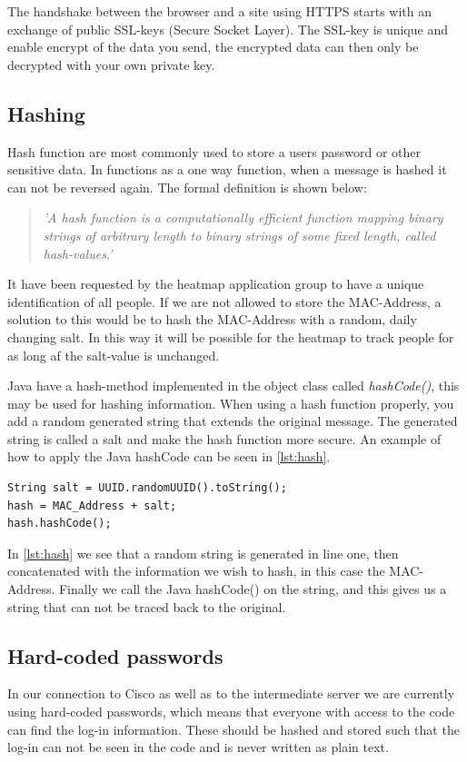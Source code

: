 The handshake between the browser and a site using HTTPS starts with an exchange of public SSL-keys (Secure Socket Layer). The SSL-key is unique and enable encrypt of the data you send, the encrypted data can then only be decrypted with your own private key\cite{HTTPS}. 

\subsection*{Hashing}
Hash function are most commonly used to store a users password or other sensitive data. In functions as a one way function, when a message is hashed it can not be reversed again. The formal definition is shown below:
\begin{quote}
\textit{'A hash function is a computationally efficient function mapping binary strings of arbitrary length to binary strings of some fixed length, called hash-values.'\cite{Hash_def}}
\end{quote}

It have been requested by the heatmap application group to have a unique identification of all people. If we are not allowed to store the MAC-Address, a solution to this would be to hash the MAC-Address with a random, daily changing salt. In this way it will be possible for the heatmap to track people for as long af the salt-value is unchanged.

Java have a hash-method implemented in the object class called \textit{hashCode()}, this may be used for hashing information. When using a hash function properly, you add a random generated string that extends the original message. The generated string is called a salt and make the hash function more secure. An example of how to apply the Java hashCode can be seen in \cref{lst:hash}.
\begin{lstlisting}[caption={Hash a MAC-Address},label={lst:hash},language=inc_Java]
String salt = UUID.randomUUID().toString();
hash = MAC_Address + salt;
hash.hashCode();
\end{lstlisting}
In \cref{lst:hash} we see that a random string is generated in line one, then concatenated with the information we wish to hash, in this case the MAC-Address. Finally we call the Java hashCode() on the string, and this gives us a string that can not be traced back to the original.

\subsection*{Hard-coded passwords}
In our connection to Cisco as well as to the intermediate server we are currently using hard-coded passwords, which means that everyone with access to the code can find the log-in information. These should be hashed and stored such that the log-in can not be seen in the code and is never written as plain text. 

